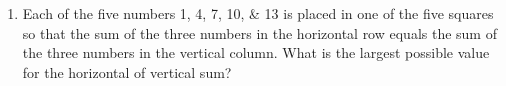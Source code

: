 \documentclass{article}
\theoremstyle{definition}
\newtheorem*{solution}{Solution}
\begin{document}
\begin{multicols}{2}
\begin{enumerate}
            There is service center on the highway located three-fourths of the way from the third exit to the tenth exit.
            At what milepost would you expect to find this service center?
            \begin{solution}
                There are $160 - 40 = 120$ miles between the third and tenth exits, so the service center is at milepost $40 + \frac{3}{4} (120) = 40 + 90 = 130$
            \end{solution}
        \item Each of the five numbers \numlist{1;4;7;10;13} is placed in one of the five squares so that the sum of the three numbers in the horizontal row equals the sum of the three numbers in the vertical column.
            What is the largest possible value for the horizontal of vertical sum?
            \begin{center}
\end{center}
\end{enumerate}
\end{multicols}
\end{document}
